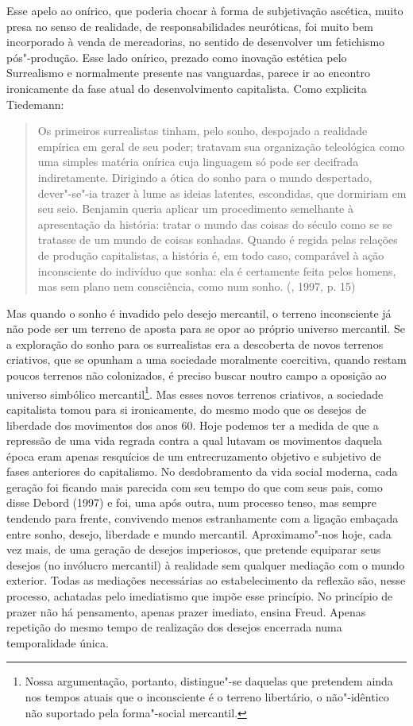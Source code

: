 Esse apelo ao onírico, que poderia chocar à forma de subjetivação
ascética, muito presa no senso de realidade, de responsabilidades
neuróticas, foi muito bem incorporado à venda de mercadorias, no sentido
de desenvolver um fetichismo pós"-produção. Esse lado onírico, prezado
como inovação estética pelo Surrealismo e normalmente presente nas
vanguardas, parece ir ao encontro ironicamente da fase atual do
desenvolvimento capitalista. Como explicita Tiedemann:

\begin{quote}
Os primeiros surrealistas tinham, pelo sonho, despojado a realidade
empírica em geral de seu poder; tratavam sua organização teleológica
como uma simples matéria onírica cuja linguagem só pode ser decifrada
indiretamente. Dirigindo a ótica do sonho para o mundo despertado,
dever"-se"-ia trazer à lume as ideias latentes, escondidas, que dormiriam
em seu seio. Benjamin queria aplicar um procedimento semelhante à
apresentação da história: tratar o mundo das coisas do século  como
se se tratasse de um mundo de coisas sonhadas. Quando é regida pelas
relações de produção capitalistas, a história é, em todo caso,
comparável à ação inconsciente do indivíduo que sonha: ela é certamente
feita pelos homens, mas sem plano nem consciência, como num sonho.
(, 1997, p. 15)
\end{quote}

Mas quando o sonho é invadido pelo desejo mercantil, o terreno
inconsciente já não pode ser um terreno de aposta para se opor ao
próprio universo mercantil. Se a exploração do sonho para os
surrealistas era a descoberta de novos terrenos criativos, que se
opunham a uma sociedade moralmente coercitiva, quando restam poucos
terrenos não colonizados, é preciso buscar noutro campo a oposição ao
universo simbólico mercantil\footnote{Nossa argumentação, portanto,
  distingue"-se daquelas que pretendem ainda nos tempos atuais que o
  inconsciente é o terreno libertário, o não"-idêntico não suportado pela
  forma"-social mercantil.}. Mas esses novos terrenos criativos, a
sociedade capitalista tomou para si ironicamente, do mesmo modo que os
desejos de liberdade dos movimentos dos anos 60. Hoje podemos ter a
medida de que a repressão de uma vida regrada contra a qual lutavam os
movimentos daquela época eram apenas resquícios de um entrecruzamento
objetivo e subjetivo de fases anteriores do capitalismo. No
desdobramento da vida social moderna, cada geração foi ficando mais
parecida com seu tempo do que com seus pais, como disse Debord (1997) e
foi, uma após outra, num processo tenso, mas sempre tendendo para
frente, convivendo menos estranhamente com a ligação embaçada entre
sonho, desejo, liberdade e mundo mercantil. Aproximamo"-nos hoje, cada
vez mais, de uma geração de desejos imperiosos, que pretende equiparar
seus desejos (no invólucro mercantil) à realidade sem qualquer mediação
com o mundo exterior. Todas as mediações necessárias ao estabelecimento
da reflexão são, nesse processo, achatadas pelo imediatismo que impõe
esse princípio. No princípio de prazer não há pensamento, apenas prazer
imediato, ensina Freud. Apenas repetição do mesmo tempo de realização
dos desejos encerrada numa temporalidade única.

